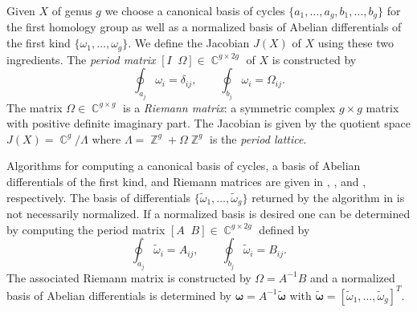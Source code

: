 \documentclass[12pt]{article}
\theoremstyle{definition}
\DeclareMathOperator{\ZZ}{\mathbb{Z}}
\DeclareMathOperator{\CC}{\mathbb{C}}
\begin{document}
Given $X$ of genus $g$ we choose a canonical basis of cycles
$\{a_1,\ldots,a_g,b_1,\ldots,b_g\}$ for the first homology group as well
as a normalized basis of Abelian differentials of the first kind
$\{\omega_1, \ldots, \omega_g\}$. We define the Jacobian $J(X)$ of $X$
using these two ingredients. The {\it period matrix} $[I \; \; \Omega]
\in \CC^{g \times 2g}$ of $X$ is constructed by
\begin{equation} \label{eqn:periodmatrix}
  \oint_{a_j} \omega_i = \delta_{ij}, \qquad
  \oint_{b_j} \omega_i = \Omega_{ij}.
\end{equation}
The matrix $\Omega \in \CC^{g \times g}$ is a {\it Riemann matrix}: a
symmetric complex $g \times g$ matrix with positive definite imaginary
part. The Jacobian is given by the quotient space $J(X) = \CC^g /
\Lambda$ where $\Lambda = \ZZ^g + \Omega \ZZ^g$ is the {\it period
  lattice}.

Algorithms for computing a canonical basis of cycles, a basis of Abelian
differentials of the first kind, and Riemann matrices are given in
\cite{TretkoffTretkoff84}, \cite{Mnuk97,vanHoeij94}, and \cite{dvh1},
respectively. The basis of differentials $\{\tilde{\omega}_1, \ldots,
\tilde{\omega}_g\}$ returned by the algorithm in
\cite{Mnuk97,vanHoeij94} is not necessarily normalized. If a normalized
basis is desired one can be determined by computing the period matrix
$[A \;\; B] \in \CC^{g \times 2g}$ defined by
\begin{equation} \label{eqn:periodmatrixnotnormal}
  \oint_{a_j} \tilde{\omega}_i = A_{ij}, \qquad
  \oint_{b_j} \tilde{\omega}_i = B_{ij}.
\end{equation}
The associated Riemann matrix is constructed by $\Omega = A^{-1}B$ and a
normalized basis of Abelian differentials is determined by
$\boldsymbol{\omega} = A^{-1}\tilde{\boldsymbol{\omega}}$ with
$\tilde{\boldsymbol{\omega}} = [\tilde{\omega}_1, \ldots,
  \tilde{\omega}_g]^T$.
\end{document}
